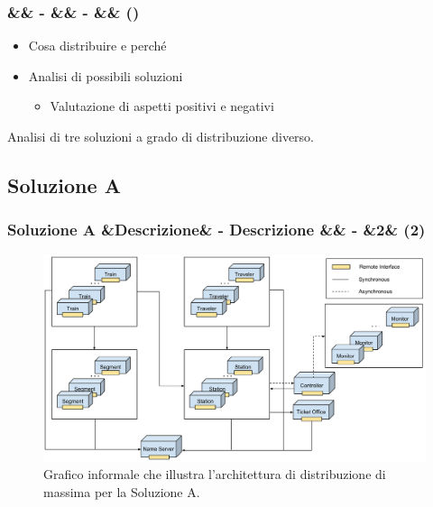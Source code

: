 \documentclass[slidestop,compress,blackandwhite]{beamer}
\newcommand{\ii}[1]{\textit{#1}}
\newcommand{\treno}{\ii{treno}}
\newcommand{\treni}{\ii{treni}}
\newcommand{\viaggiatore}{\ii{viaggiatore}}
\newcommand{\viaggiatori}{\ii{viaggiatori}}
\newcommand{\stazione}{\ii{stazione}}
\newcommand{\stazioni}{\ii{stazioni}}
\newcommand{\biglietteria}{\ii{biglietteria}}
\newcommand{\controller}{\ii{controllo centrale}}
\newcommand{\newtitle}[4]{
	#1 
	\ifx&#2&%
	\else
  		\large- #2
	\fi
	\ifx&#3&%
	\else
  		\normalsize- #3
	\fi
	\ifx&#4&%
	\else
  		\normalsize (#4)
	\fi
}
\newcommand{\newframe}[5]{
	\begin{frame}
		\frametitle{\newtitle{#1}{#2}{#3}{#4}}
		#5
	\end{frame}
}
\newcommand{\myitemize}[1]{\begin{itemize}#1\end{itemize}}
\begin{document}
	\newframe{}{}{}{}{
		
		\begin{itemize}
			\item Cosa distribuire e perché
			\item Analisi di possibili soluzioni
				\myitemize{
					\item Valutazione di aspetti positivi e negativi
				}
		\end{itemize}
		
		Analisi di tre soluzioni a grado di distribuzione diverso. 
		
	}
	
	\subsection{Soluzione A}
	
	
	\newframe{Soluzione A}{Descrizione}{}{2}{
		\begin{figure}
			\includegraphics[scale=0.24,trim=0mm 5mm 0mm 35mm]{imgs/All_distributed.pdf}
			\caption{\scriptsize Grafico informale che illustra l'architettura di distribuzione di massima per la Soluzione A.}
		\end{figure}
	}
	
\end{document}
